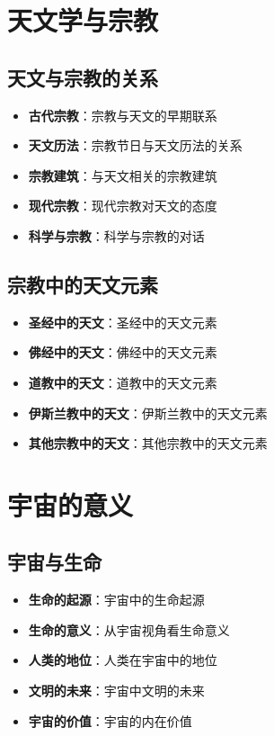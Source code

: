 \documentclass[12pt,UTF8]{ctexbook}
\begin{document}
\chapter{天文学与宗教}
\section{天文与宗教的关系}

\begin{itemize}
  \item \textbf{古代宗教}：宗教与天文的早期联系
  \item \textbf{天文历法}：宗教节日与天文历法的关系
  \item \textbf{宗教建筑}：与天文相关的宗教建筑
  \item \textbf{现代宗教}：现代宗教对天文的态度
  \item \textbf{科学与宗教}：科学与宗教的对话
\end{itemize}

\section{宗教中的天文元素}

\begin{itemize}
  \item \textbf{圣经中的天文}：圣经中的天文元素
  \item \textbf{佛经中的天文}：佛经中的天文元素
  \item \textbf{道教中的天文}：道教中的天文元素
  \item \textbf{伊斯兰教中的天文}：伊斯兰教中的天文元素
  \item \textbf{其他宗教中的天文}：其他宗教中的天文元素
\end{itemize}

\chapter{宇宙的意义}
\section{宇宙与生命}

\begin{itemize}
  \item \textbf{生命的起源}：宇宙中的生命起源
  \item \textbf{生命的意义}：从宇宙视角看生命意义
  \item \textbf{人类的地位}：人类在宇宙中的地位
  \item \textbf{文明的未来}：宇宙中文明的未来
  \item \textbf{宇宙的价值}：宇宙的内在价值
\end{itemize}
\end{document}
